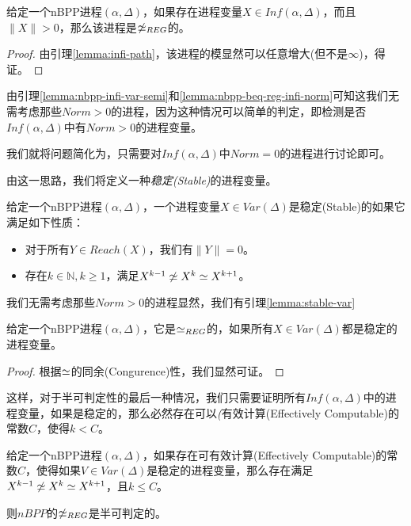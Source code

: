 \begin{lem}\label{lemma:nbpp-beq-reg-infi-norm}
给定一个nBPP进程$(\alpha,\Delta)$，如果存在进程变量$X\in Inf(\alpha,\Delta)$，而且$\|X\|>0$，那么该进程是$\not\simeq_{REG}$的。
\end{lem}

\begin{proof}
由引理\ref{lemma:infi-path}，该进程的模显然可以任意增大(但不是$\infty$)，得证。
\end{proof}

由引理\ref{lemma:nbpp-infi-var-semi}和\ref{lemma:nbpp-beq-reg-infi-norm}可知这我们无需考虑那些$Norm>0$的进程，因为这种情况可以简单的判定，即检测是否$Inf(\alpha,\Delta)$中有$Norm>0$的进程变量。

我们就将问题简化为，只需要对$Inf(\alpha,\Delta)$中$Norm=0$的进程进行讨论即可。

由这一思路，我们将定义一种\emph{稳定(Stable)}的进程变量。

\begin{defn}\label{def:stable-var}
给定一个nBPP进程$(\alpha,\Delta)$，一个进程变量$X \in Var(\Delta)$是稳定(Stable)的如果它满足如下性质：
\begin{itemize}
	\item 对于所有$Y\in Reach(X)$，我们有$\|Y\|=0$。
	\item 存在$k\in \mathbb{N},k\geq 1$，满足$X^{k-1}\not\simeq X^k\simeq X^{k+1}$。
\end{itemize}
\end{defn}

我们无需考虑那些$Norm>0$的进程显然，我们有引理\ref{lemma:stable-var}

\begin{lem}\label{lemma:stable-var}
给定一个nBPP进程$(\alpha,\Delta)$，它是$\simeq_{REG}$的，如果所有$X\in Var(\Delta)$都是稳定的进程变量。
\end{lem}

\begin{proof}
根据$\simeq$的同余(Congurence)性，我们显然可证。
\end{proof}

这样，对于半可判定性的最后一种情况，我们只需要证明所有$Inf(\alpha,\Delta)$中的进程变量，如果是稳定的，那么必然存在可以\emph(有效计算(Effectively Computable)的常数$C$，使得$k<C$。

\begin{lem}\label{lemma:term}
给定一个nBPP进程$(\alpha,\Delta)$，如果存在可有效计算(Effectively Computable)的常数$C$，使得如果$V\in Var(\Delta)$是稳定的进程变量，那么存在满足$X^{k-1}\not\simeq X^k\simeq X^{k+1}$，且$k\leq C$。

则$nBPP$的$\not\simeq_{REG}$是半可判定的。
\end{lem}

